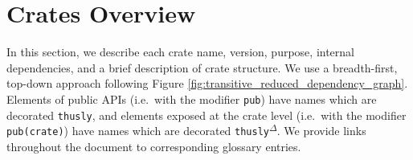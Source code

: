 \documentclass[12pt,a4paper]{article}
\begin{document}

\section{Crates Overview}\label{sec:crate_summaries}

In this section, we describe each crate name, version, purpose, internal dependencies, and a brief description of crate structure. We use a breadth-first, top-down approach following Figure \ref{fig:transitive_reduced_dependency_graph}. Elements of public APIs (i.e.\ with the modifier \texttt{pub}) have names which are decorated \texttt{thusly}\textsuperscript{\textdagger}, and elements exposed at the crate level (i.e.\ with the modifier \texttt{pub(crate)}) have names which are decorated \texttt{thusly}\textsuperscript{$\Delta$}. We provide links throughout the document to corresponding glossary entries.

\end{document}
